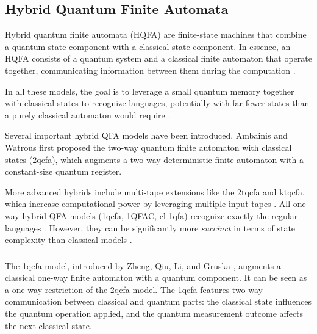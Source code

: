 \subsection{Hybrid Quantum Finite Automata}
\label{sec:hybrid-qfa}

Hybrid quantum finite automata (HQFA) are finite-state machines that combine a quantum state component with a classical state component. In essence, an HQFA consists of a quantum system and a classical finite automaton that operate together, communicating information between them during the computation \cite{li2015hybrid}.

In all these models, the goal is to leverage a small quantum memory together with classical states to recognize languages, potentially with far fewer states than a purely classical automaton would require \cite{zheng2012one}.

Several important hybrid QFA models have been introduced. Ambainis and Watrous \cite{ambainis2002two} first proposed the two-way quantum finite automaton with classical states (\gls{2qcfa}), which augments a two-way deterministic finite automaton with a constant-size quantum register. 

More advanced hybrids include multi-tape extensions like the \gls{2tqcfa} and \gls{ktqcfa}, which increase computational power by leveraging multiple input tapes \cite{zheng2011two}. All one-way hybrid QFA models (\gls{1qcfa}, 1QFAC, \gls{cl-1qfa}) recognize exactly the regular languages \cite{li2015hybrid, zheng2012one}. However, they can be significantly more \textit{succinct} in terms of state complexity than classical models \cite{xiao2021state}.

\subsubsection{}

The \gls{1qcfa} model, introduced by Zheng, Qiu, Li, and Gruska \cite{zheng2012one}, augments a classical one-way finite automaton with a quantum component. It can be seen as a one-way restriction of the \gls{2qcfa} model. The \gls{1qcfa} features two-way communication between classical and quantum parts: the classical state influences the quantum operation applied, and the quantum measurement outcome affects the next classical state.

